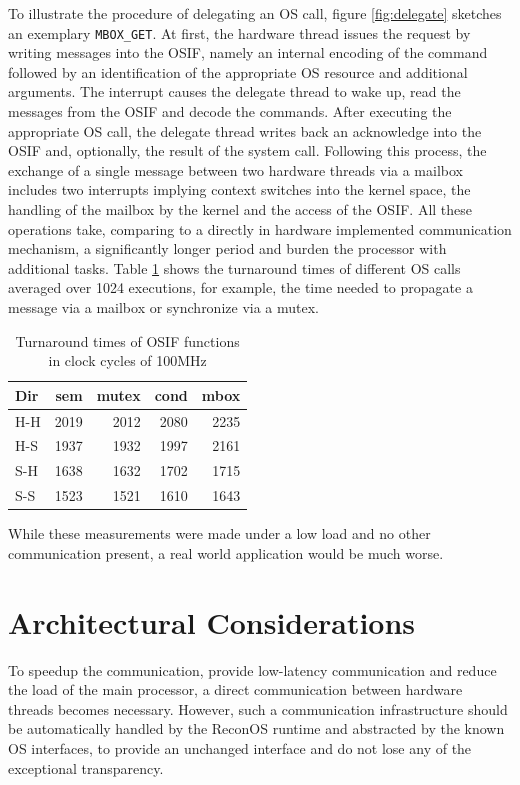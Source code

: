 To illustrate the procedure of delegating an \ac{OS} call, figure
\ref{fig:delegate} sketches an exemplary \lstinline{MBOX_GET}. At first, the
hardware thread issues the request by writing messages into the \ac{OSIF},
namely an internal encoding of the command followed by an identification of
the appropriate \ac{OS} resource and additional arguments. The interrupt
causes the delegate thread to wake up, read the messages from the \ac{OSIF}
and decode the commands. After executing the appropriate \ac{OS} call, the
delegate thread writes back an acknowledge into the \ac{OSIF} and, optionally,
the result of the system call. Following this process, the exchange of a
single message between two hardware threads via a mailbox includes two
interrupts implying context switches into the kernel space, the handling of
the mailbox by the kernel and the access of the \ac{OSIF}. All these
operations take, comparing to a directly in hardware implemented communication
mechanism, a significantly longer period and burden the processor with
additional tasks. Table \ref{tab:delegate_old} shows the turnaround times of
different \ac{OS} calls averaged over 1024 executions, for example, the time
needed to propagate a message via a mailbox or synchronize via a mutex.
\begin{table}[ht]
	\centering
	\renewcommand{\arraystretch}{1.2}
	\begin{tabular}{l r r r r}
		\hline
		Dir & sem & mutex & cond  & mbox\\
		\hline
		\hline
		H-H & 2019 & 2012 & 2080 & 2235\\
		H-S & 1937 & 1932 & 1997 & 2161\\
		S-H & 1638 & 1632 & 1702 & 1715\\
		S-S & 1523 & 1521 & 1610 & 1643\\
		\hline
	\end{tabular}
	\caption{Turnaround times of OSIF functions in clock cycles of 100MHz}
	\label{tab:delegate_old}
\end{table}
While these measurements were made under a low load and no other communication
present, a real world application would be much worse. 

\section{Architectural Considerations}
To speedup the communication, provide low-latency communication and reduce the
load of the main processor, a direct communication between hardware threads
becomes necessary. However, such a communication infrastructure should be
automatically handled by the ReconOS runtime and abstracted by the known
\ac{OS} interfaces, to provide an unchanged interface and do not lose any of
the exceptional transparency.

